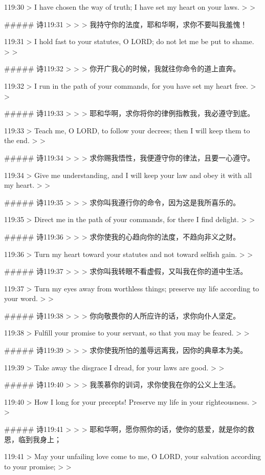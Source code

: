119:30
> I have chosen the way of truth; I have set my heart on your laws.
>
> 


##### 诗119:31
> 
>
> 我持守你的法度，耶和华啊，求你不要叫我羞愧！


119:31
> I hold fast to your statutes, O LORD; do not let me be put to shame.
>
> 


##### 诗119:32
> 
>
> 你开广我心的时候，我就往你命令的道上直奔。


119:32
> I run in the path of your commands, for you have set my heart free.
>
> 


##### 诗119:33
> 
>
> 耶和华啊，求你将你的律例指教我，我必遵守到底。


119:33
> Teach me, O LORD, to follow your decrees; then I will keep them to the end.
>
> 


##### 诗119:34
> 
>
> 求你赐我悟性，我便遵守你的律法，且要一心遵守。


119:34
> Give me understanding, and I will keep your law and obey it with all my heart.
>
> 


##### 诗119:35
> 
>
> 求你叫我遵行你的命令，因为这是我所喜乐的。


119:35
> Direct me in the path of your commands, for there I find delight.
>
> 


##### 诗119:36
> 
>
> 求你使我的心趋向你的法度，不趋向非义之财。


119:36
> Turn my heart toward your statutes and not toward selfish gain.
>
> 


##### 诗119:37
> 
>
> 求你叫我转眼不看虚假，又叫我在你的道中生活。


119:37
> Turn my eyes away from worthless things; preserve my life according to your word.
>
> 


##### 诗119:38
> 
>
> 你向敬畏你的人所应许的话，求你向仆人坚定。


119:38
> Fulfill your promise to your servant, so that you may be feared.
>
> 


##### 诗119:39
> 
>
> 求你使我所怕的羞辱远离我，因你的典章本为美。


119:39
> Take away the disgrace I dread, for your laws are good.
>
> 


##### 诗119:40
> 
>
> 我羡慕你的训词，求你使我在你的公义上生活。


119:40
> How I long for your precepts! Preserve my life in your righteousness.
>
> 


##### 诗119:41
> 
>
> 耶和华啊，愿你照你的话，使你的慈爱，就是你的救恩，临到我身上；


119:41
> May your unfailing love come to me, O LORD, your salvation according to your promise;
>
> 


